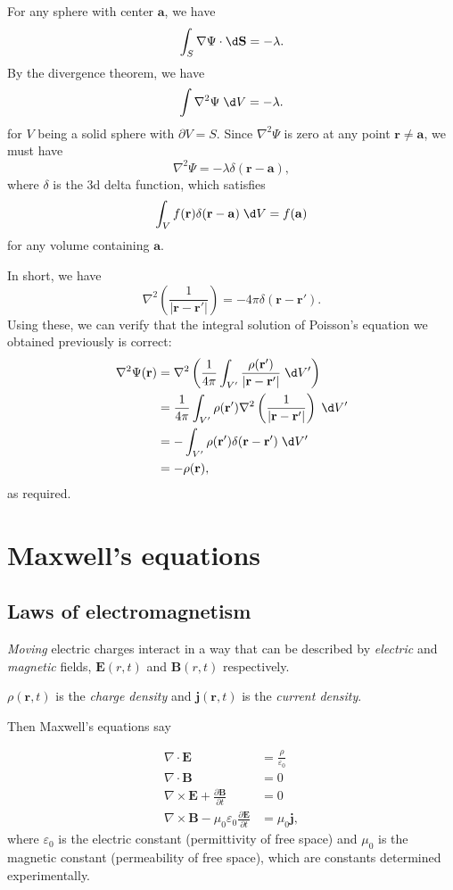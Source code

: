 \documentclass[a4paper]{article}
\begin{document}
For any sphere with center $\mathbf{a}$, we have
\[
  \int_S \nabla \Psi\cdot \d \mathbf{S} = -\lambda.
\]
By the divergence theorem, we have
\[
  \int \nabla^2\Psi \;\d V = -\lambda.
\]
for $V$ being a solid sphere with $\partial V = S$. Since $\nabla^2\Psi$ is zero at any point $\mathbf{r} \not = \mathbf{a}$, we must have
\[
  \nabla^2\Psi = -\lambda \delta(\mathbf{r} - \mathbf{a}),
\]
where $\delta$ is the 3d delta function, which satisfies
\[
  \int_V f(\mathbf{r}) \delta (\mathbf{r} - \mathbf{a})\;\d V = f(\mathbf{a})
\]
for any volume containing $\mathbf{a}$.

In short, we have
\[
  \nabla^2\left(\frac{1}{|\mathbf{r} - \mathbf{r}'|}\right) = -4\pi\delta(\mathbf{r} - \mathbf{r}').
\]
Using these, we can verify that the integral solution of Poisson's equation we obtained previously is correct:
\begin{align*}
  \nabla^2 \Psi(\mathbf{r}) &= \nabla^2\left(\frac{1}{4\pi}\int_{V'}\frac{\rho(\mathbf{r}')}{|\mathbf{r} - \mathbf{r}'|}\;\d V'\right)\\
  &= \frac{1}{4\pi}\int_{V'} \rho(\mathbf{r}')\nabla^2\left(\frac{1}{|\mathbf{r} - \mathbf{r}'|}\right)\;\d V'\\
  &= -\int_{V'} \rho(\mathbf{r}') \delta(\mathbf{r} - \mathbf{r}')\;\d V'\\
  &= -\rho (\mathbf{r}),
\end{align*}
as required.
\section{Maxwell's equations}
\subsection{Laws of electromagnetism}
\begin{defi}
  \emph{Moving} electric charges interact in a way that can be described by \emph{electric} and \emph{magnetic} fields, $\mathbf{E}(r, t)$ and $\mathbf{B}(r, t)$ respectively.
\end{defi}
\begin{notation}
  $\rho(\mathbf{r}, t)$ is the \emph{charge density} and $\mathbf{j}(\mathbf{r}, t)$ is the \emph{current density}.
\end{notation}
Then Maxwell's equations say
\begin{law}
  \begin{align*}
    \nabla\cdot \mathbf{E} &= \frac{\rho}{\varepsilon_0}\\
    \nabla\cdot \mathbf{B} &= 0\\
    \nabla\times \mathbf{E} + \frac{\partial \mathbf{B}}{\partial t} &= 0\\
    \nabla\times \mathbf{B} - \mu_0\varepsilon_0 \frac{\partial \mathbf{E}}{\partial t} &= \mu_0 \mathbf{j},
  \end{align*}
  where $\varepsilon_0$ is the electric constant (permittivity of free space) and $\mu_0$ is the magnetic constant (permeability of free space), which are constants determined experimentally.
\end{law}
\end{document}
